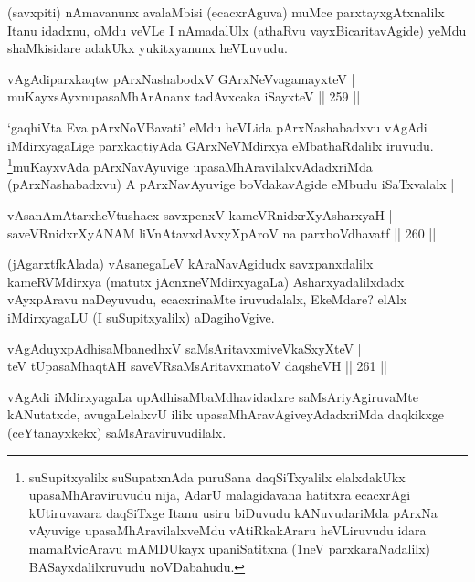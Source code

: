\begin{artha}
(savxpiti) nAmavanunx avalaMbisi (ecacxrAguva) muMce parxtayxgAtxnalilx Itanu idadxnu, oMdu veVLe I nAmadalUlx (athaRvu vayxBicaritavAgide) yeMdu shaMkisidare adakUkx yukitxyanunx heVLuvudu.
\end{artha}


\begin{shl}
vAgAdiparxkaqtw pArxNashabodxV GArxNeV\s vagamayxteV |\\
muKayxsAyxnupasaMhArAnanx tadAvxcaka iSayxteV \hfill || 259 ||
\end{shl}

\begin{artha}
`gaqhiVta Eva pArxNoVBavati' eMdu heVLida pArxNashabadxvu vAgAdi 
iMdirxya\-gaLige parxkaqtiyAda GArxNeVMdirxya eMbathaRdalilx iruvudu. 
\footnote{suSupitxyalilx suSupatxnAda puruSana daqSiTxyalilx 
elalxdakUkx upasaMhAraviruvudu nija, AdarU malagidavana hatitxra ecacxrAgi kUtiruvavara daqSiTxge Itanu usiru biDuvudu kANuvudariMda pArxNa vAyuvige upasaMhAravilalxveMdu vAtiRkakAraru heVLiruvudu idara mamaRvicAravu mAMDUkayx upaniSatitxna (1neV parxkaraNadalilx) BASayxdalilxruvudu noVDabahudu.}muKayxvAda pArxNavAyuvige upasaMhAravilalxvAdadxriMda (pArxNashabadxvu) A pArxNavAyuvige boVdakavAgide eMbudu iSaTxvalalx |
\end{artha}

\begin{shl}
vAsanAmAtarxheVtushacx savxpenxV kameVRnidxrXyAsharxyaH |\\
saveVRnidxrXyANAM liVnAtavxdAvxyXpAroV na parxboVdhavatf \hfill || 260 ||
\end{shl}

\begin{artha}
(jAgarxtfkAlada) vAsanegaLeV kAraNavAgidudx savxpanxdalilx  kameRVMdirxya (matutx jAcnxneVMdirxyagaLa) Asharxyadalilxdadx vAyxpAravu naDeyuvudu, ecacxrinaMte iruvu\-dalalx, EkeMdare? elAlx iMdirxyagaLU (I suSupitxyalilx) aDagihoVgive.
\end{artha}

\begin{shl}
vAgAduyxpAdhisaMbanedhxV saMsAritavxmiveVkaSxyXteV |\\
teV tUpasaMhaqtAH saveVR\s saMsAritavxmatoV daqsheVH \hfill || 261 ||
\end{shl}

\begin{artha}
vAgAdi iMdirxyagaLa upAdhisaMbaMdhavidadxre saMsAriyAgiruvaMte kANu\-tatxde, avugaLelalxvU ililx upasaMhAravAgiveyAdadxriMda daqkikxge (ceYtanayxkekx) saMsAraviruvudilalx.
\end{artha}


